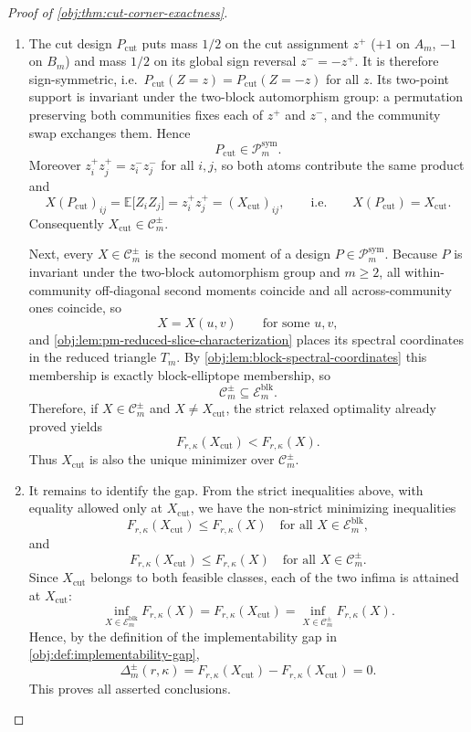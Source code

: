 \begin{proof}[Proof of \cref{obj:thm:cut-corner-exactness}]
\begin{enumerate}
\item
The cut design \(P_{\mathrm{cut}}\) puts mass \(1/2\) on the cut assignment \(z^+\) (\(+1\) on \(A_m\), \(-1\) on \(B_m\)) and mass \(1/2\) on its global sign reversal \(z^-=-z^+\).  It is therefore sign-symmetric, i.e.\ \(P_{\mathrm{cut}}(Z=z)=P_{\mathrm{cut}}(Z=-z)\) for all \(z\).  Its two-point support is invariant under the two-block automorphism group: a permutation preserving both communities fixes each of \(z^+\) and \(z^-\), and the community swap exchanges them.  Hence
\[
P_{\mathrm{cut}}\in\mathcal P_m^{\mathrm{sym}} .
\]
Moreover \(z^+_iz^+_j=z^-_iz^-_j\) for all \(i,j\), so both atoms contribute the same product and
\[
X(P_{\mathrm{cut}})_{ij}
=\mathbb E\bigl[Z_iZ_j\bigr]
=z^+_iz^+_j
=(X_{\mathrm{cut}})_{ij},
\qquad\text{i.e.}\qquad
X(P_{\mathrm{cut}})=X_{\mathrm{cut}} .
\]
Consequently \(X_{\mathrm{cut}}\in\mathcal C_m^{\pm}\).

Next, every \(X\in\mathcal C_m^{\pm}\) is the second moment of a design \(P\in\mathcal P_m^{\mathrm{sym}}\).  Because \(P\) is invariant under the two-block automorphism group and \(m\ge2\), all within-community off-diagonal second moments coincide and all across-community ones coincide, so
\[
X=X(u,v)
\qquad\text{for some }u,v ,
\]
and \cref{obj:lem:pm-reduced-slice-characterization} places its spectral coordinates in the reduced triangle \(T_m\).  By \cref{obj:lem:block-spectral-coordinates} this membership is exactly block-elliptope membership, so
\[
\mathcal C_m^{\pm}\subseteq \mathcal E_m^{\mathrm{blk}}.
\]
Therefore, if \(X\in\mathcal C_m^{\pm}\) and \(X\ne X_{\mathrm{cut}}\), the strict relaxed optimality already proved yields
\[
F_{r,\kappa}(X_{\mathrm{cut}})<F_{r,\kappa}(X).
\]
Thus \(X_{\mathrm{cut}}\) is also the unique minimizer over \(\mathcal C_m^{\pm}\).

\item
It remains to identify the gap. From the strict inequalities above, with equality allowed only at
\(X_{\mathrm{cut}}\), we have the non-strict minimizing inequalities
\[
F_{r,\kappa}(X_{\mathrm{cut}})\le F_{r,\kappa}(X)
\quad\text{for all }X\in\mathcal E_m^{\mathrm{blk}},
\]
and
\[
F_{r,\kappa}(X_{\mathrm{cut}})\le F_{r,\kappa}(X)
\quad\text{for all }X\in\mathcal C_m^{\pm}.
\]
Since \(X_{\mathrm{cut}}\) belongs to both feasible classes, each of the two infima is attained at \(X_{\mathrm{cut}}\):
\[
\inf_{X\in\mathcal E_m^{\mathrm{blk}}}F_{r,\kappa}(X)
=F_{r,\kappa}(X_{\mathrm{cut}})
=\inf_{X\in\mathcal C_m^{\pm}}F_{r,\kappa}(X).
\]
Hence, by the definition of the implementability gap in \cref{obj:def:implementability-gap},
\[
\Delta_m^{\pm}(r,\kappa)
=
F_{r,\kappa}(X_{\mathrm{cut}})
-
F_{r,\kappa}(X_{\mathrm{cut}})
=0.
\]
This proves all asserted conclusions.
\end{enumerate}
\end{proof}


